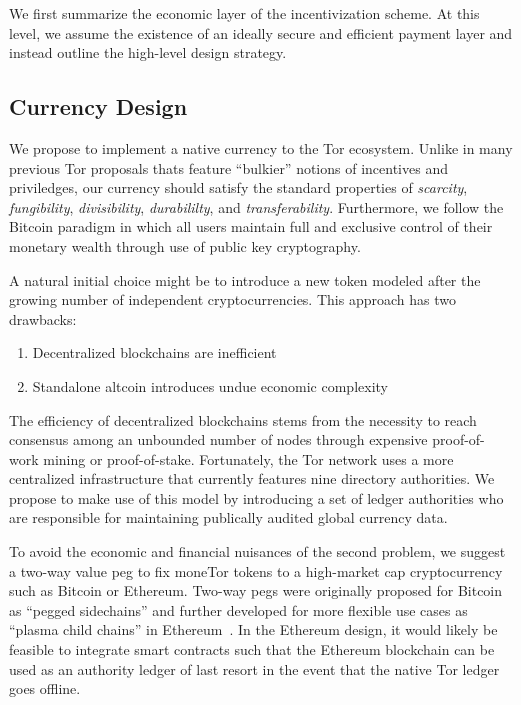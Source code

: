We first summarize the economic layer of the incentivization scheme. At this
level, we assume the existence of an ideally secure and efficient payment layer
and instead outline the high-level design strategy.

\subsection{Currency Design}

We propose to implement a native currency to the Tor ecosystem. Unlike in many
previous Tor proposals thats feature ``bulkier'' notions of incentives and
priviledges, our currency should satisfy the standard properties of
\textit{scarcity}, \textit{fungibility}, \textit{divisibility},
\textit{durabililty}, and \textit{transferability}.  Furthermore, we
follow the Bitcoin paradigm in which all users maintain full and exclusive
control of their monetary wealth through use of public key cryptography.

A natural initial choice might be to introduce a new token modeled after the
growing number of independent cryptocurrencies. This approach has two drawbacks:

\begin{enumerate}
\item Decentralized blockchains are inefficient
\item Standalone altcoin introduces undue economic complexity
\end{enumerate}

The efficiency of decentralized blockchains stems from the necessity to reach
consensus among an unbounded number of nodes through expensive proof-of-work
mining or proof-of-stake. Fortunately, the Tor network uses a more centralized
infrastructure that currently features nine directory authorities. We propose to
make use of this model by introducing a set of ledger authorities who are
responsible for maintaining publically audited global currency data.

To avoid the economic and financial nuisances of the second problem, we suggest
a two-way value peg to fix moneTor tokens to a high-market cap cryptocurrency
such as Bitcoin or Ethereum. Two-way pegs were originally proposed for Bitcoin
as ``pegged sidechains'' and further developed for more flexible use cases as
``plasma child chains'' in Ethereum~\cite{back2014enabling, poon2017plasma}. In
the Ethereum design, it would likely be feasible to integrate smart contracts
such that the Ethereum blockchain can be used as an authority ledger of last
resort in the event that the native Tor ledger goes offline.

